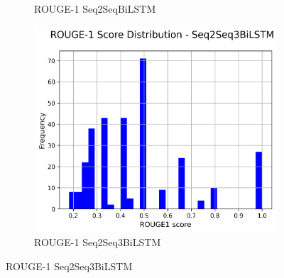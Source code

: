 \documentclass[a4paper, 12pt]{article}
\begin{document}
\begin{figure}[H]
\begin{subfigure}{0.32\textwidth}
        \caption{ROUGE-1 Seq2SeqBiLSTM}
    \end{subfigure}
    \hfill
    \begin{subfigure}{0.32\textwidth}
        \centering
        \includegraphics[width=\textwidth]{media/Seq2Seq3BiLSTM_rouge1_scores.png}
        \caption{ROUGE-1 Seq2Seq3BiLSTM}
    \end{subfigure}
    

\end{figure}
\end{document}
